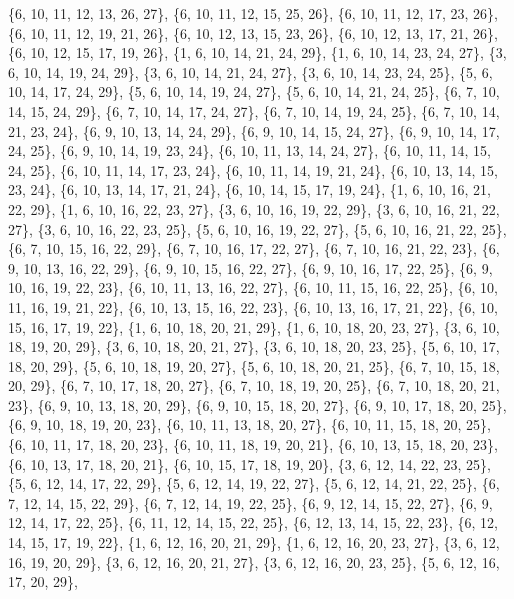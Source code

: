 \documentclass[11pt,a4paper]{article}
\begin{document}
{\{6, 10, 11, 12, 13, 26, 27\}, \{6, 10, 11, 12, 15, 25, 26\}, \{6, 10, 11, 12, 17, 23, 26\}, \{6, 10, 11, 12, 19, 21, 26\}, \{6, 10, 12, 13, 15, 23, 26\},
\{6, 10, 12, 13, 17, 21, 26\}, \{6, 10, 12, 15, 17, 19, 26\}, \{1, 6, 10, 14, 21, 24, 29\}, \{1, 6, 10, 14, 23, 24, 27\}, \{3, 6, 10, 14, 19, 24, 29\},
\{3, 6, 10, 14, 21, 24, 27\}, \{3, 6, 10, 14, 23, 24, 25\}, \{5, 6, 10, 14, 17, 24, 29\}, \{5, 6, 10, 14, 19, 24, 27\}, \{5, 6, 10, 14, 21, 24, 25\},
\{6, 7, 10, 14, 15, 24, 29\}, \{6, 7, 10, 14, 17, 24, 27\}, \{6, 7, 10, 14, 19, 24, 25\}, \{6, 7, 10, 14, 21, 23, 24\}, \{6, 9, 10, 13, 14, 24, 29\},
\{6, 9, 10, 14, 15, 24, 27\}, \{6, 9, 10, 14, 17, 24, 25\}, \{6, 9, 10, 14, 19, 23, 24\}, \{6, 10, 11, 13, 14, 24, 27\}, \{6, 10, 11, 14, 15, 24, 25\},
\{6, 10, 11, 14, 17, 23, 24\}, \{6, 10, 11, 14, 19, 21, 24\}, \{6, 10, 13, 14, 15, 23, 24\}, \{6, 10, 13, 14, 17, 21, 24\}, \{6, 10, 14, 15, 17, 19, 24\},
\{1, 6, 10, 16, 21, 22, 29\}, \{1, 6, 10, 16, 22, 23, 27\}, \{3, 6, 10, 16, 19, 22, 29\}, \{3, 6, 10, 16, 21, 22, 27\}, \{3, 6, 10, 16, 22, 23, 25\},
\{5, 6, 10, 16, 19, 22, 27\}, \{5, 6, 10, 16, 21, 22, 25\}, \{6, 7, 10, 15, 16, 22, 29\}, \{6, 7, 10, 16, 17, 22, 27\}, \{6, 7, 10, 16, 21, 22, 23\},
\{6, 9, 10, 13, 16, 22, 29\}, \{6, 9, 10, 15, 16, 22, 27\}, \{6, 9, 10, 16, 17, 22, 25\}, \{6, 9, 10, 16, 19, 22, 23\}, \{6, 10, 11, 13, 16, 22, 27\},
\{6, 10, 11, 15, 16, 22, 25\}, \{6, 10, 11, 16, 19, 21, 22\}, \{6, 10, 13, 15, 16, 22, 23\}, \{6, 10, 13, 16, 17, 21, 22\}, \{6, 10, 15, 16, 17, 19, 22\},
\{1, 6, 10, 18, 20, 21, 29\}, \{1, 6, 10, 18, 20, 23, 27\}, \{3, 6, 10, 18, 19, 20, 29\}, \{3, 6, 10, 18, 20, 21, 27\}, \{3, 6, 10, 18, 20, 23, 25\},
\{5, 6, 10, 17, 18, 20, 29\}, \{5, 6, 10, 18, 19, 20, 27\}, \{5, 6, 10, 18, 20, 21, 25\}, \{6, 7, 10, 15, 18, 20, 29\}, \{6, 7, 10, 17, 18, 20, 27\},
\{6, 7, 10, 18, 19, 20, 25\}, \{6, 7, 10, 18, 20, 21, 23\}, \{6, 9, 10, 13, 18, 20, 29\}, \{6, 9, 10, 15, 18, 20, 27\}, \{6, 9, 10, 17, 18, 20, 25\},
\{6, 9, 10, 18, 19, 20, 23\}, \{6, 10, 11, 13, 18, 20, 27\}, \{6, 10, 11, 15, 18, 20, 25\}, \{6, 10, 11, 17, 18, 20, 23\}, \{6, 10, 11, 18, 19, 20, 21\},
\{6, 10, 13, 15, 18, 20, 23\}, \{6, 10, 13, 17, 18, 20, 21\}, \{6, 10, 15, 17, 18, 19, 20\}, \{3, 6, 12, 14, 22, 23, 25\}, \{5, 6, 12, 14, 17, 22, 29\},
\{5, 6, 12, 14, 19, 22, 27\}, \{5, 6, 12, 14, 21, 22, 25\}, \{6, 7, 12, 14, 15, 22, 29\}, \{6, 7, 12, 14, 19, 22, 25\}, \{6, 9, 12, 14, 15, 22, 27\},
\{6, 9, 12, 14, 17, 22, 25\}, \{6, 11, 12, 14, 15, 22, 25\}, \{6, 12, 13, 14, 15, 22, 23\}, \{6, 12, 14, 15, 17, 19, 22\}, \{1, 6, 12, 16, 20, 21, 29\},
\{1, 6, 12, 16, 20, 23, 27\}, \{3, 6, 12, 16, 19, 20, 29\}, \{3, 6, 12, 16, 20, 21, 27\}, \{3, 6, 12, 16, 20, 23, 25\}, \{5, 6, 12, 16, 17, 20, 29\},
}
\end{document}
